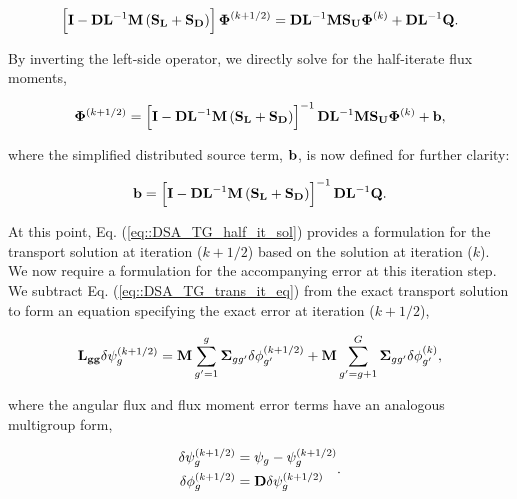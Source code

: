 \begin{equation}
\label{eq::DSA_TG_half_it}
\left[ {\bf I} - {\bf D}{\bf L}^{-1} {\bf M} \left(  {\bf S_L} + {\bf S_D} \right) \right]{\bf \Phi}^{(k+1/2)} = {\bf D}{\bf L}^{-1}  {\bf M} {\bf S_U} {\bf \Phi}^{(k)} + {\bf D}{\bf L}^{-1}  {\bf Q} .
\end{equation}

\noindent By inverting the left-side operator, we directly solve for the half-iterate flux moments,

\begin{equation}
\label{eq::DSA_TG_half_it_sol}
{\bf \Phi}^{(k+1/2)} = \left[ {\bf I} - {\bf D}{\bf L}^{-1} {\bf M} \left(  {\bf S_L} + {\bf S_D} \right) \right]^{-1} {\bf D}{\bf L}^{-1}  {\bf M} {\bf S_U} {\bf \Phi}^{(k)} + {\bf b} ,
\end{equation}

\noindent where the simplified distributed source term, ${\bf b}$, is now defined for further clarity:

\begin{equation}
\label{eq::DSA_TG_half_it_forcingfunc}
{\bf b} = \left[ {\bf I} - {\bf D}{\bf L}^{-1} {\bf M} \left(  {\bf S_L} + {\bf S_D} \right) \right]^{-1} {\bf D}{\bf L}^{-1}  {\bf Q} .
\end{equation}

At this point, Eq. (\ref{eq::DSA_TG_half_it_sol}) provides a formulation for the transport solution at iteration ($k+1/2$) based on the solution at iteration ($k$). We now require a formulation for the accompanying error at this iteration step. We subtract Eq. (\ref{eq::DSA_TG_trans_it_eq}) from the exact transport solution to form an equation specifying the exact error at iteration ($k+1/2$),

\begin{equation}
\label{eq::DSA_TG_trans_err}
{\bf L_{gg}} \delta \psi_g^{(k+1/2)} = {\bf M} \sum_{g'=1}^g {\bf \Sigma}_{g g'}\delta \phi_{g'}^{(k+1/2)} + {\bf M} \sum_{g'=g+1}^G {\bf \Sigma}_{g g'} \delta \phi_{g'}^{(k)},
\end{equation}

\noindent where the angular flux and flux moment error terms have an analogous multigroup form,

\begin{equation}
\label{eq::DSA_TG_error_terms}
\begin{aligned}
\delta \psi_g^{(k+1/2)} &= \psi_g - \psi_g^{(k+1/2)} \\
\delta \phi_g^{(k+1/2)} &= {\bf D} \delta \psi_g^{(k+1/2)}
\end{aligned} .
\end{equation}

